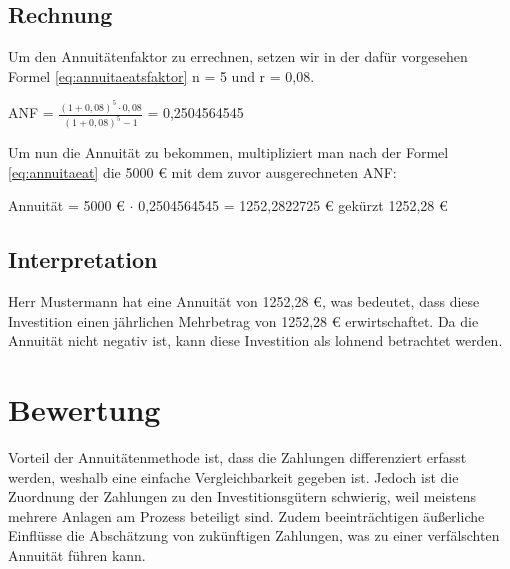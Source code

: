 \subsection{Rechnung}

Um den Annuitätenfaktor zu errechnen, setzen wir in der dafür vorgesehen Formel \eqref{eq:annuitaeatsfaktor} n = 5 und r = 0,08.

\bigskip

ANF = $\frac{ (1 + 0,08)^5 \cdot 0,08 }{ (1 + 0,08)^5 - 1 }$ = 0,2504564545

\bigskip

\noindent
Um nun die Annuität zu bekommen, multipliziert man nach der Formel \eqref{eq:annuitaeat} die 5000 € mit dem zuvor ausgerechneten ANF:

\bigskip

Annuität = 5000 € $\cdot$ 0,2504564545 = 1252,2822725 € gekürzt 1252,28 €

\subsection{Interpretation}

Herr Mustermann hat eine Annuität von 1252,28 €, was bedeutet, dass diese Investition einen jährlichen Mehrbetrag von 1252,28 € erwirtschaftet. Da die Annuität nicht negativ ist, kann diese Investition als lohnend betrachtet werden.

\section{Bewertung}

Vorteil der Annuitätenmethode ist, dass die Zahlungen differenziert erfasst werden, weshalb eine einfache Vergleichbarkeit gegeben ist. Jedoch ist die Zuordnung der Zahlungen zu den Investitionsgütern schwierig, weil meistens mehrere Anlagen am Prozess beteiligt sind. Zudem beeinträchtigen äußerliche Einflüsse die Abschätzung von zukünftigen Zahlungen, was zu einer verfälschten Annuität führen kann.
